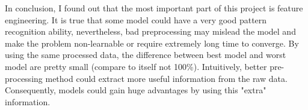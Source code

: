 \documentclass[11pt]{article}
\begin{document}
In conclusion, I found out that the most important part of this project is feature engineering.
It is true that some model could have a very good pattern recognition ability, nevertheless,
bad preprocessing 
may mislead the model and make the problem non-learnable or require extremely long time to converge.
By using the same processed data, the difference between best model and worst model are pretty small
(compare to itself not 100\%). Intuitively, better pre-processing method could extract 
more useful information from the raw data. Consequently, models could gain huge advantages by 
using this "extra" information.



\end{document}
